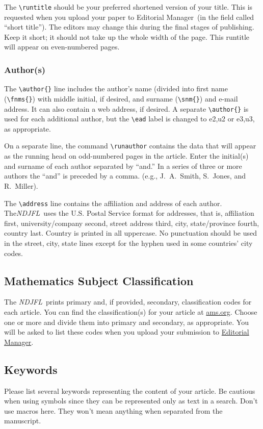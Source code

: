 \documentclass{ndjflart}
\theoremstyle{definition}
\theoremstyle{remark}
\newcommand{\NDJFL}{\emph{NDJFL}}
\newcommand{\EM}{Editorial Manager}
\begin{document}
The \verb=\runtitle= should be your preferred shortened version of
your title.  This is requested when you upload your paper to \EM\ (in
the field called ``short title''). The editors may change this during
the final stages of publishing.  Keep it short; it should not take up
the whole width of the page.  This runtitle will appear on
even-numbered pages.

\subsubsection{Author(s)}\label{authordata} The \verb=\author{}= line
includes the author's name (divided into first name (\verb=\fnms{}=)
with middle initial, if desired, and surname (\verb=\snm{}=) and
e-mail address.  It can also contain a web address, if desired.  A
separate \verb=\author{}= is used for each additional author, but the
\verb=\ead= label is changed to e2,u2 or e3,u3, as appropriate.

On a separate line, the command \verb=\runauthor= contains the data
that will appear as the running head on odd-numbered pages in the
article.  Enter the initial(s) and surname of each author separated by
``and.''  In a series of three or more authors the ``and'' is preceded
by a comma. (e.g., J.~A.~Smith, S.~Jones, and R.~Miller).

The \verb=\address= line contains the affiliation and address of each
author.  The\linebreak \NDJFL\ uses the U.S. Postal Service format for
addresses, that is, affiliation first, university/company second,
street address third, city, state/province fourth, country last.
Country is printed in all uppercase. No punctuation should be used in
the street, city, state lines except for the hyphen used in some
countries' city codes.

\subsection{Mathematics Subject Classification}\label{msc} 
The \NDJFL\ prints primary and, if provided, secondary, classification
codes for each article.  You can find the classification(s) for your
article at
\href{http://www.ams.org/mathscinet/freeTools.html}{ams.org}.  Choose
one or more and divide them into primary and secondary, as
appropriate.  You will be asked to list these codes when you upload
your submission to
\href{http://www.editorialmanager.com/ndjfl}{Editorial Manager}.

\subsection{Keywords}\label{kwd} Please list several keywords
representing the content of your article.  Be cautious when using
symbols since they can be represented only as text in a search.  Don't
use macros here. They won't mean anything when separated from the
manuscript.
\end{document}
